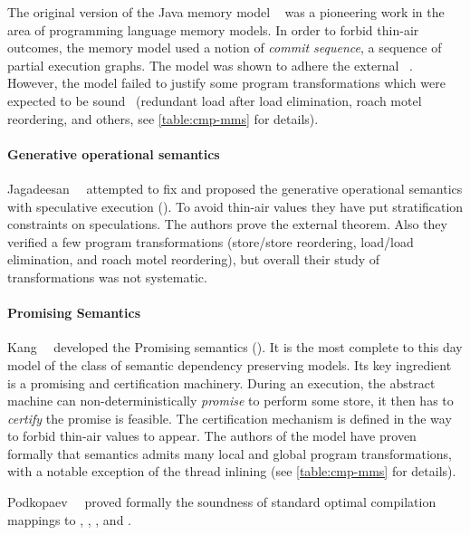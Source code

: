 The original version of the Java memory model \JMM~\cite{Manson-al:POPL05}
was a pioneering work in the area of programming language memory models. 
In order to forbid thin-air outcomes, the memory model used 
a notion of \emph{commit sequence}, \ie a sequence of partial execution graphs.
The model was shown to adhere the external \DRF~\cite{Huisman-Petri:CONCUR07}.
However, the model failed to justify some program transformations 
which were expected to be sound~\cite{Sevcik-Aspinall:ECOOP08} 
(\eg redundant load after load elimination, roach motel reordering, and others,
see \cref{table:cmp-mms} for details). 

\paragraph{Generative operational semantics}

Jagadeesan~\etal~\cite{Jagadeesan-al:ESOP10} attempted to fix \JMM 
and proposed the generative operational semantics 
with speculative execution (\GOS).
To avoid thin-air values they have put stratification constraints 
on speculations. The authors prove the external \DRF theorem. 
Also they verified a few program transformations 
(store/store reordering, load/load elimination, and roach motel reordering), 
but overall their study of transformations was not systematic.  

\paragraph{Promising Semantics}

Kang~\etal~\cite{Kang-al:POPL17, Lee-al:PLDI20} developed 
the Promising semantics (\PRM).
It is the most complete to this day model of the class of
semantic dependency preserving models. 
Its key ingredient is a promising and certification machinery.
During an execution, the abstract machine can 
non-deterministically \emph{promise} to perform some store,
it then has to \emph{certify} the promise is feasible. 
The certification mechanism is defined in the way to forbid thin-air values to appear.
The authors of the model have proven formally 
that \Promising semantics admits many local and global program transformations,
with a notable exception of the thread inlining
(see \cref{table:cmp-mms} for details).

Podkopaev~\etal~\cite{Podkopaev-al:ECOOP17, Podkopaev-al:POPL19} 
proved formally the soundness of standard optimal 
compilation mappings to \Intel, , , and \POWER.

